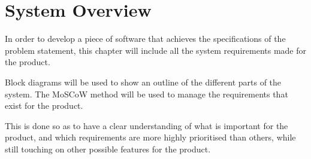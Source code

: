 \section{System Overview}
In order to develop a piece of software that achieves the specifications of the problem statement, this chapter will include all the system requirements made for the product. 

Block diagrams will be used to show an outline of the different parts of the system. The MoSCoW method will be used to manage the requirements that exist for the product. 

This is done so as to have a clear understanding of what is important for the product, and which requirements are more highly prioritised than others, while still touching on other possible features for the product. 

